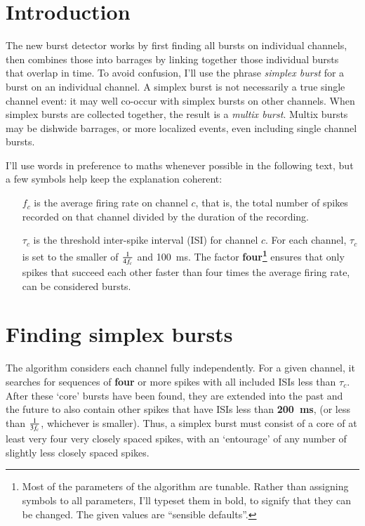 \documentclass{article}
\begin{document}
\medskip



\section{Introduction}

The new burst detector works by first finding all bursts on individual
channels, then combines those into barrages by linking together those
individual bursts that overlap in time. To avoid confusion, I'll use
the phrase {\it simplex burst} for a burst on an individual channel. A
simplex burst is not necessarily a true single channel event: it may
well co-occur with simplex bursts on other channels. When simplex
bursts are collected together, the result is a {\it multix burst}.
Multix bursts may be dishwide barrages, or more localized events,
even including single channel bursts.

I'll use words in preference to maths whenever possible in the
following text, but a few symbols help keep the explanation coherent:

\begin{itemize}
\item[$f_c$] is the average firing rate on channel $c$, that is, the total
number of spikes recorded on that channel divided by the duration of
the recording.
\item[$\tau_c$] is the threshold inter-spike interval (ISI) for
channel $c$. For each channel, $\tau_c$ is set to the smaller of
$1\over{4f_c}$ and 100~ms. The factor {\bf four\footnote{Most of the
parameters of the algorithm are tunable. Rather than assigning symbols to
all parameters, I'll typeset them in bold, to signify that they can be
changed. The given values are ``sensible defaults''.}} ensures that
only spikes that succeed each other faster than four times the average
firing rate, can be considered bursts.
\end{itemize}



\section{Finding simplex bursts}

The algorithm considers each channel fully independently. For a given
channel, it searches for sequences of {\bf four} or more spikes with
all included ISIs less than $\tau_c$. After these `core' bursts have
been found, they are extended into the past and the future to also
contain other spikes that have ISIs less than {\bf 200~ms}, (or less
than $1\over{3f_c}$, whichever is smaller). Thus, a simplex burst must
consist of a core of at least very four very closely spaced spikes,
with an `entourage' of any number of slightly less closely spaced
spikes.
\end{document}
